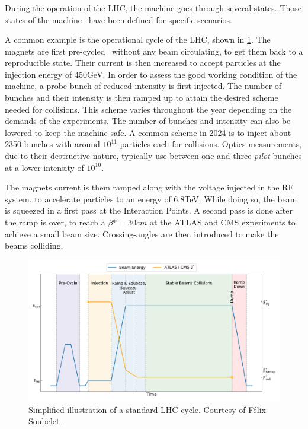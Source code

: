 \subsubsection{}

During the operation of the LHC, the machine goes through several states. Those states of the
machine~\cite{wenniger_lhc_2019} have been defined for specific scenarios.

A common example is the operational cycle of the LHC, shown in \cref{fig:cern_complex:cycle}. The
magnets are first pre-cycled~\cite{bottura_pre-cycles_2010} without any beam circulating, to get
them back to a reproducible state. Their current is then increased to accept particles at the 
injection energy of 450GeV. In order to assess the good working condition of the machine, a probe
bunch of reduced intensity is first injected. The number of bunches and their intensity is then
ramped up to attain the desired scheme needed for collisions. This scheme varies throughout the year
depending on the demands of the experiments. The number of bunches and intensity can also be lowered
to keep the machine safe. A common scheme in 2024 is to inject about 2350 bunches with around
$10^{11}$ particles each for collisions.
Optics measurements, due to their destructive nature, typically use between one and three
\textit{pilot} bunches at a lower intensity of $10^{10}$.

The magnets current is them ramped along with the voltage injected in the RF system, to accelerate
particles to an energy of 6.8TeV. While doing so, the beam is squeezed in a first pass at the
Interaction Points. A second pass is done after the ramp is over, to reach a $\beta* = 30cm$ at the
ATLAS and CMS experiments to achieve a small beam size. Crossing-angles are then introduced to make
the beams colliding.

\begin{figure}[!htb]
    \includegraphics[width=\textwidth]{./images/lhc_cycle.pdf}
    \caption{Simplified illustration of a standard LHC cycle. Courtesy of Félix
    Soubelet~\cite{felix_soubelet_local_2023}.}
    \label{fig:cern_complex:cycle}
\end{figure}


